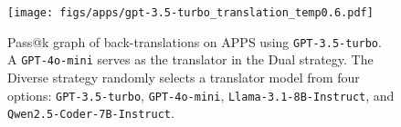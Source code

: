 \begin{figure}[ht]
\vspace{-0.5cm}
    \centering
    \begin{minipage}{0.38\textwidth}
        \texttt{[image: figs/apps/gpt-3.5-turbo\_translation\_temp0.6.pdf]}
        \label{fig:turbo_translation_scaling}
    \end{minipage}
    \caption{Pass@k graph of back-translations on APPS using \texttt{GPT-3.5-turbo}. %
    A \texttt{GPT-4o-mini} serves as the translator in the Dual strategy. The Diverse strategy randomly selects a translator model from four options: \texttt{GPT-3.5-turbo},  \texttt{GPT-4o-mini},  \texttt{Llama-3.1-8B-Instruct}, and \texttt{Qwen2.5-Coder-7B-Instruct}.}
    \label{fig:translation_scaling}
\end{figure}